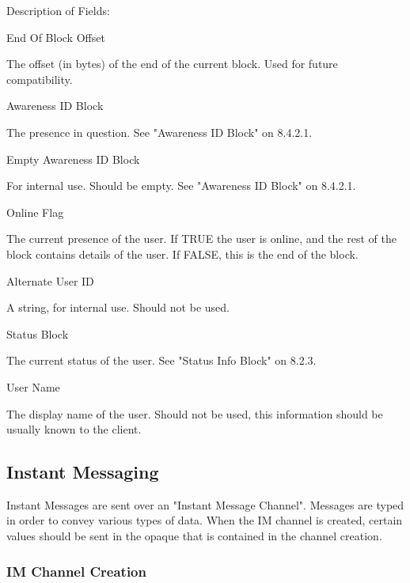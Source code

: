 \documentclass[titlepage,oneside]{book}
\begin{document}
\par{} Description of Fields:

\par{} End Of Block Offset

\subpar{}  The offset (in bytes) of the end of the current block. Used for
  future compatibility.

\par{} Awareness ID Block

\subpar{}  The presence in question. See "Awareness ID Block" on
8.4.2.1.

\par{} Empty Awareness ID Block

\subpar{}  For internal use. Should be empty. See "Awareness ID Block" on
  8.4.2.1.

\par{} Online Flag

\subpar{}  The current presence of the user. If TRUE the user is online, and
  the rest of the block contains details of the user. If FALSE, this
  is the end of the block.

\par{} Alternate User ID

\subpar{}  A string, for internal use. Should not be used.

\par{} Status Block

\subpar{}  The current status of the user. See "Status Info Block" on
  8.2.3.

\par{} User Name

\subpar{}  The display name of the user. Should not be used, this information
  should be usually known to the client.

\subsection{Instant Messaging}

\par{} Instant Messages are sent over an "Instant Message Channel". Messages
are typed in order to convey various types of data. When the IM channel
is created, certain values should be sent in the opaque that is
contained in the channel creation.

\subsubsection{IM Channel Creation}
\end{document}
